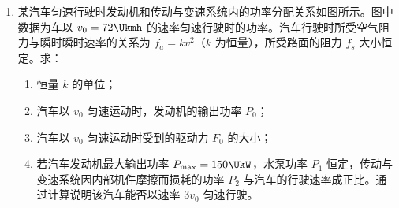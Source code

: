\documentclass[\gkver]{gaokaozhenti}
\begin{document}
\begin{enumerate}
{\begin{enumerate}
	\item
	$R=\frac{2BL^{2}}{TI_{0}}$

	\item
	$F_{A}(t)=\frac{BLI_{0}}{T}t$

\end{enumerate}
}

\item
某汽车匀速行驶时发动机和传动与变速系统内的功率分配关系如图所示。图中数据为车以 $v_{0}=72\Ukmh$ 的速率匀速行驶时的功率。汽车行驶时所受空气阻力与瞬时瞬时速率的关系为 $f_{a}=kv^{2}$（$k$ 为恒量），所受路面的阻力 $f_{s}$ 大小恒定。求：
\begin{enumerate}
	\item
	恒量 $k$ 的单位；
	\item
	汽车以 $v_{0}$ 匀速运动时，发动机的输出功率 $P_{0}$；
	\item
	汽车以 $v_{0}$ 匀速运动时受到的驱动力 $F_{0}$ 的大小；
	\item
	若汽车发动机最大输出功率 $P_{\max}=150\UkW$，水泵功率 $P_{1}$ 恒定，传动与变速系统因内部机件摩擦而损耗的功率 $P_{2}$ 与汽车的行驶速率成正比。通过计算说明该汽车能否以速率 $3v_{0}$ 匀速行驶。
\end{enumerate}
\onepicture[align=right, w=10.00cm]{}
\jdanswer{
\begin{enumerate}
	\item
	$\Ukgm$

	\item
	$17\UkW$

	\item
	$500\UN$


\end{enumerate}}
\end{enumerate}
\end{document}
